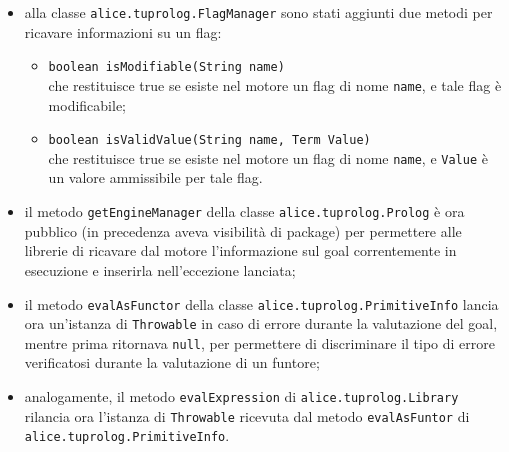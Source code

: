 \begin{itemize}

\item alla classe \texttt{alice.tuprolog.FlagManager} sono stati aggiunti due metodi per ricavare informazioni su un flag:
    
    \begin{itemize}
      \item \texttt{boolean isModifiable(String name)}\\
        che restituisce true se esiste nel motore un flag di nome \texttt{name}, e tale flag \`{e} modificabile;

      \item \texttt{boolean isValidValue(String name, Term Value)}\\
        che restituisce true se esiste nel motore un flag di nome \texttt{name}, e \texttt{Value} \`{e} un valore ammissibile per tale flag.
    \end{itemize}

  \item il metodo \texttt{getEngineManager} della classe \texttt{alice.tuprolog.Prolog} \`{e} ora pubblico (in precedenza aveva visibilit\`{a} di package) per permettere alle librerie di ricavare dal motore l'informazione sul goal correntemente in esecuzione e inserirla nell'eccezione lanciata;

  \item il metodo \texttt{evalAsFunctor} della classe \texttt{alice.tuprolog.PrimitiveInfo} lancia ora un'istanza di \texttt{Throwable} in caso di errore durante la valutazione del goal, mentre prima ritornava \texttt{null}, per permettere di discriminare il tipo di errore verificatosi durante la valutazione di un funtore;

  \item analogamente, il metodo \texttt{evalExpression} di \texttt{alice.tuprolog.Library} rilancia ora l'istanza di \texttt{Throwable} ricevuta dal metodo \texttt{evalAsFuntor} di \texttt{alice.tuprolog.PrimitiveInfo}.
\end{itemize}
